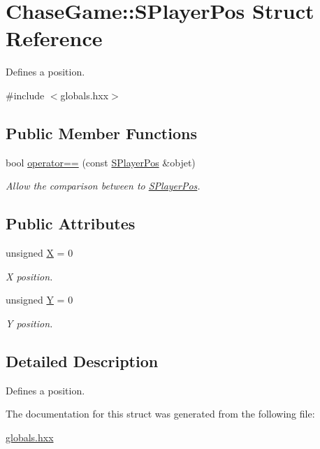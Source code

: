 \hypertarget{struct_chase_game_1_1_s_player_pos}{\section{Chase\-Game\-:\-:S\-Player\-Pos Struct Reference}
\label{struct_chase_game_1_1_s_player_pos}
}


Defines a position.  




{\ttfamily \#include $<$globals.\-hxx$>$}

\subsection*{Public Member Functions}
\begin{DoxyCompactItemize}
\item 
\hypertarget{struct_chase_game_1_1_s_player_pos_a16d84d116194f402b751f7265dd4fb91}{bool \hyperlink{struct_chase_game_1_1_s_player_pos_a16d84d116194f402b751f7265dd4fb91}{operator==} (const \hyperlink{struct_chase_game_1_1_s_player_pos}{S\-Player\-Pos} \&objet)}\label{struct_chase_game_1_1_s_player_pos_a16d84d116194f402b751f7265dd4fb91}

\begin{DoxyCompactList}\small\item\em Allow the comparison between to \hyperlink{struct_chase_game_1_1_s_player_pos}{S\-Player\-Pos}. \end{DoxyCompactList}\end{DoxyCompactItemize}
\subsection*{Public Attributes}
\begin{DoxyCompactItemize}
\item 
\hypertarget{struct_chase_game_1_1_s_player_pos_a28b353619ad10ef89da6308319b6ee39}{unsigned \hyperlink{struct_chase_game_1_1_s_player_pos_a28b353619ad10ef89da6308319b6ee39}{X} = 0}\label{struct_chase_game_1_1_s_player_pos_a28b353619ad10ef89da6308319b6ee39}

\begin{DoxyCompactList}\small\item\em X position. \end{DoxyCompactList}\item 
\hypertarget{struct_chase_game_1_1_s_player_pos_a0e20d9da2b1da89994a83e8acd72814c}{unsigned \hyperlink{struct_chase_game_1_1_s_player_pos_a0e20d9da2b1da89994a83e8acd72814c}{Y} = 0}\label{struct_chase_game_1_1_s_player_pos_a0e20d9da2b1da89994a83e8acd72814c}

\begin{DoxyCompactList}\small\item\em Y position. \end{DoxyCompactList}\end{DoxyCompactItemize}


\subsection{Detailed Description}
Defines a position. 

The documentation for this struct was generated from the following file\-:\begin{DoxyCompactItemize}
\item 
\hyperlink{globals_8hxx}{globals.\-hxx}\end{DoxyCompactItemize}
